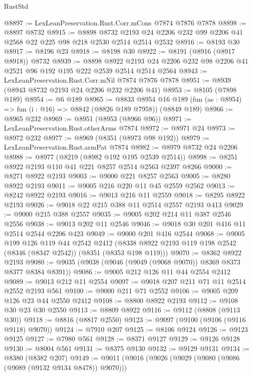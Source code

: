 \begin{lexlean}{RustStd}
\begin{coremodule}
{\begin{coremodule}
{{{{{{{{{{{{{{{{{{{{{{{{{{{{{{{{{{{{{{{{{{{{{{{{{{@8897 := LexLeanPreservation.Rust.Corr.mCons @7874 @7876 @7878
@8898 := @8897 @8732
@8915 := @8898
    @8732
    @2193
    @24
    @2206
    @232
    @99
    @2206
    @41
    @2568
    @22
    @225
    @98
    @218
    @2530
    @2514
    @2514
    @2532
@8916 := @8193 @30
@8917 := @8196 @23
@8918 := @8198 @30
@8922 := @8191 (@8916 (@8917 @8918)) @8732
@8939 := @8898
    @8922
    @2193
    @24
    @2206
    @232
    @98
    @2206
    @41
    @2521
    @96
    @192
    @195
    @222
    @2539
    @2514
    @2514
    @2564
@8943 := LexLeanPreservation.Rust.Corr.mNil @7874 @7876 @7878
@8951 := @8939 (@8943 @8732 @2193 @24 @2206 @232 @2206 @41)
@8953 := @8105 (@7898 @189)
@8954 := @6 @189
@8965 := @8833
    @8954
    @16
    @189
    (fun (as : @8954) => fun (i : @16) => @8842 (@8826 @189 @7958))
    (@8849 @189)
@8966 := @8965 @232
@8969 := @8951 (@8953 (@8966 @96))
@8971 := LexLeanPreservation.Rust.otherArms @7874
@8972 := @8971 @24
@8973 := @8972 @232
@8977 := @8969 (@8351 (@8973 @98 @192))
@8979 := LexLeanPreservation.Rust.armPat @7874
@8982 := @8979 @8732 @24 @2206
@8988 := @8977 (@8219 (@8982 @192 @195 @2539 @2514))
@8998 := @8251 @8922 @2193 @110 @41 @221 @8257 @2514 @2563 @2397 @8266
@9000 := @8271 @8922 @2193
@9003 := @9000 @221 @8257 @2563
@9005 := @8280 @8922 @2193
@9011 := @9005 @216 @220 @11 @45 @2559 @2562
@9013 := @8242 @8922 @2193
@9016 := @9013 @216 @11 @2559
@9018 := @8295 @8922 @2193
@9026 := @9018 @22 @215 @388 @11 @2514 @2557 @2193 @413
@9029 := @9000 @215 @388 @2557
@9035 := @9005 @202 @214 @11 @387 @2546 @2556
@9038 := @9013 @202 @11 @2546
@9046 := @9018 @30 @201 @416 @11 @2514 @2544 @2206 @423
@9049 := @9000 @201 @416 @2544
@9068 := @9005
    @199
    @126
    @119
    @44
    @2542
    @2412
    (@8338 @8922 @2193 @119 @198 @2542 (@8346 (@8347 @2542)) (@8351 (@8353 @198 @119)))
@9070 := @8362 @8922 @2193
@9080 := @9035 (@9038 (@9046 (@9049 (@9068 @9070)) @8369 @8373 @8377 @8384 @8391))
@9086 := @9005 @212 @126 @11 @44 @2554 @2412
@9089 := @9013 @212 @11 @2554
@9097 := @9018 @207 @211 @71 @11 @2514 @2552 @2193 @561
@9100 := @9000 @211 @71 @2552
@9106 := @9005 @209 @126 @23 @44 @2550 @2412
@9108 := @8800 @8922 @2193
@9112 := @9108 @30 @23 @30 @2550
@9113 := @8809 @8922
@9116 := @9112 (@8808 (@9113 @30))
@9118 := @8816 (@8817 @2550)
@9123 := @9097 (@9100 (@9106 (@9116 @9118) @9070))
@9124 := @7910 @207
@9125 := @8106 @9124
@9126 := @9123 @9125
@9127 := @7980 @561
@9128 := @8371 @9127
@9129 := @9126 @9128
@9130 := @8004 @561
@9131 := @8375 @9130
@9132 := @9129 @9131
@9134 := @8380 (@8382 @207)
@9149 := @9011
    (@9016
      (@9026
        (@9029 (@9080 (@9086 (@9089 (@9132 @9134 @8478)) @9070)))
}}}}}}}}}}}}}}}}}}}}}}}}}}}}}}}}}}}}}}}}}}}}}}}}}}
\end{coremodule}}
\end{coremodule}
\end{lexlean}
